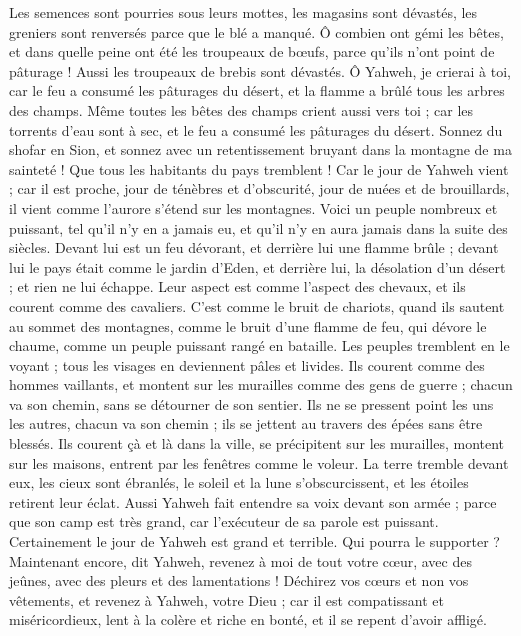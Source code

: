 \begin{multicols}{2}
Les semences sont pourries sous leurs mottes, les magasins sont dévastés, les greniers sont renversés parce que le blé a manqué.
Ô combien ont gémi les bêtes, et dans quelle peine ont été les troupeaux de bœufs, parce qu'ils n'ont point de pâturage ! Aussi les troupeaux de brebis sont dévastés.
Ô Yahweh, je crierai à toi, car le feu a consumé les pâturages du désert, et la flamme a brûlé tous les arbres des champs.
Même toutes les bêtes des champs crient aussi vers toi ; car les torrents d'eau sont à sec, et le feu a consumé les pâturages du désert.
\VerseOne{}Sonnez du shofar en Sion, et sonnez avec un retentissement bruyant dans la montagne de ma sainteté ! Que tous les habitants du pays tremblent ! Car le jour de Yahweh vient ; car il est proche,
jour de ténèbres et d'obscurité, jour de nuées et de brouillards, il vient comme l'aurore s'étend sur les montagnes. Voici un peuple nombreux et puissant, tel qu'il n'y en a jamais eu, et qu'il n'y en aura jamais dans la suite des siècles.
Devant lui est un feu dévorant, et derrière lui une flamme brûle ; devant lui le pays était comme le jardin d'Eden, et derrière lui, la désolation d'un désert ; et rien ne lui échappe. 
Leur aspect est comme l'aspect des chevaux, et ils courent comme des cavaliers.
C'est comme le bruit de chariots, quand ils sautent au sommet des montagnes, comme le bruit d'une flamme de feu, qui dévore le chaume, comme un peuple puissant rangé en bataille.
Les peuples tremblent en le voyant ; tous les visages en deviennent pâles et livides.
Ils courent comme des hommes vaillants, et montent sur les murailles comme des gens de guerre ; chacun va son chemin, sans se détourner de son sentier.
Ils ne se pressent point les uns les autres, chacun va son chemin ; ils se jettent au travers des épées sans être blessés.
Ils courent çà et là dans la ville, se précipitent sur les murailles, montent sur les maisons, entrent par les fenêtres comme le voleur.
La terre tremble devant eux, les cieux sont ébranlés, le soleil et la lune s'obscurcissent, et les étoiles retirent leur éclat.
Aussi Yahweh fait entendre sa voix devant son armée ; parce que son camp est très grand, car l'exécuteur de sa parole est puissant. Certainement le jour de Yahweh est grand et terrible. Qui pourra le supporter ?
Maintenant encore, dit Yahweh, revenez à moi de tout votre cœur, avec des jeûnes, avec des pleurs et des lamentations !
Déchirez vos cœurs et non vos vêtements, et revenez à Yahweh, votre Dieu ; car il est compatissant et miséricordieux, lent à la colère et riche en bonté, et il se repent d'avoir affligé.

\end{multicols}
